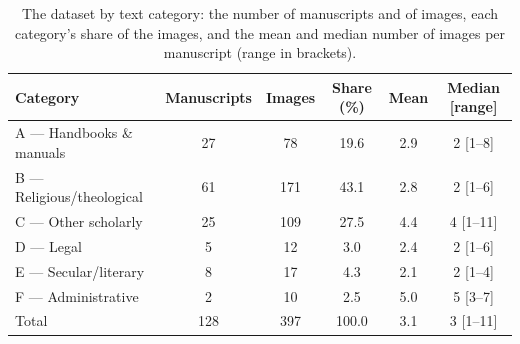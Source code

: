 \begin{table}[htbp]
  \centering
  \caption{The dataset by text category: the number of manuscripts and of images, each category's share of the images, and the mean and median number of images per manuscript (range in brackets).}
  \label{tab:dataset_categories}
  \begin{tabular}{lccccc}
    \toprule
    Category & Manuscripts & Images & Share (\%) & Mean & Median [range] \\
    \midrule
    A --- Handbooks \& manuals & 27 & 78 & 19.6 & 2.9 & 2 [1--8] \\
    B --- Religious/theological & 61 & 171 & 43.1 & 2.8 & 2 [1--6] \\
    C --- Other scholarly & 25 & 109 & 27.5 & 4.4 & 4 [1--11] \\
    D --- Legal & 5 & 12 & 3.0 & 2.4 & 2 [1--6] \\
    E --- Secular/literary & 8 & 17 & 4.3 & 2.1 & 2 [1--4] \\
    F --- Administrative & 2 & 10 & 2.5 & 5.0 & 5 [3--7] \\
    \midrule
    Total & 128 & 397 & 100.0 & 3.1 & 3 [1--11] \\
    \bottomrule
  \end{tabular}
\end{table}
